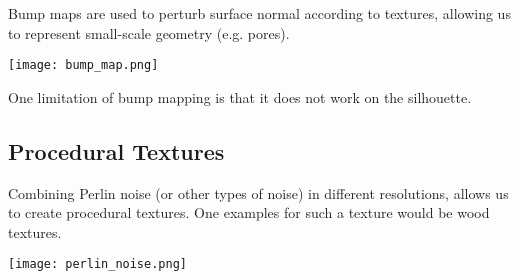 Bump maps are used to perturb surface normal according to textures, allowing us to represent small-scale geometry (e.g. pores).
\begin{center}
	\texttt{[image: bump\_map.png]}
\end{center}

One limitation of bump mapping is that it does not work on the silhouette.


\subsection{Procedural Textures}

Combining Perlin noise (or other types of noise) in different resolutions, allows us to create procedural textures. One examples for such a texture would be wood textures.

\begin{center}
	\texttt{[image: perlin\_noise.png]}
\end{center}
